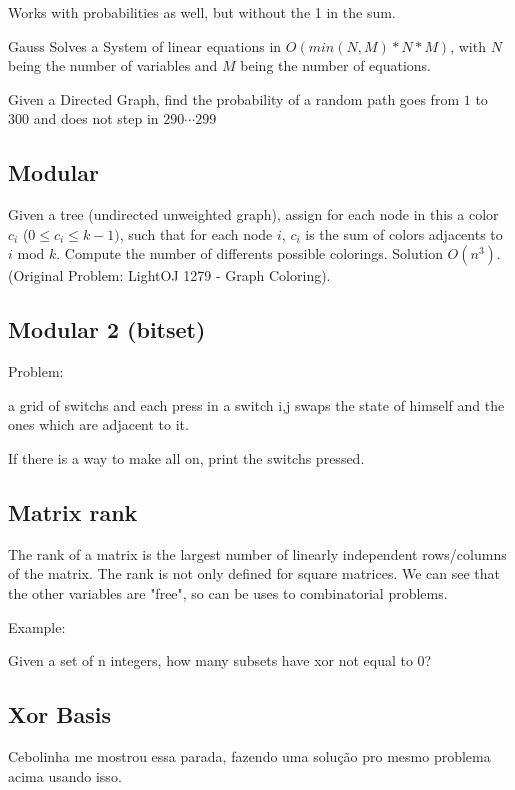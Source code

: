     Works with probabilities as well, but without the 1 in the sum.

    Gauss Solves a System of linear equations in $O(min(N,M)*N*M)$, with $N$ being the number of variables and $M$ being the number of equations.

    Given a Directed Graph, find the probability of a random path goes from $1$ to $300$ and does not step in $290 \cdots 299$
    

    
    \subsection{Modular}
    Given a tree (undirected unweighted graph), assign for each node in this a color $c_i$ ($0 \leq c_i \leq k - 1)$, such that for each node $i$, $c_i$ is the sum of colors adjacents to $i$ mod $k$.
    \bigskip
    Compute the number of differents possible colorings.
    \bigskip
    Solution $O(n^3)$.
    \bigskip
    (Original Problem: LightOJ 1279 - Graph Coloring).
    
    \subsection{Modular 2 (bitset)}
    Problem:
    
    a grid of switchs and each press in a switch i,j swaps the state of himself and the ones which are adjacent to it.
    
    If there is a way to make all on, print the switchs pressed.
    
    
    \subsection{Matrix rank}
    The rank of a matrix is the largest number of linearly independent rows/columns of the matrix. The rank is not only defined for square matrices.
    We can see that the other variables are "free", so can be uses to combinatorial problems.
    
    Example:
    
    Given a set of n integers, how many subsets have xor not equal to 0?
    

    \subsection{Xor Basis}
    Cebolinha me mostrou essa parada, fazendo uma solução pro mesmo problema acima usando isso.

